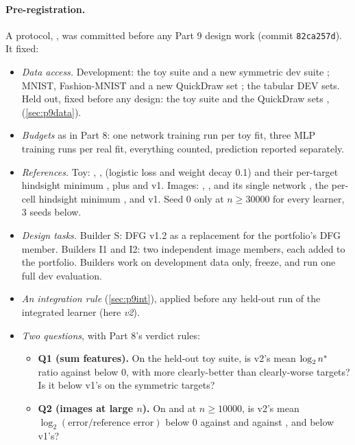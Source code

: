 \paragraph{Pre-registration.} A protocol, , was committed before any Part 9 design work (commit \texttt{82ca257d}). It fixed:
\begin{itemize}
\item \emph{Data access.} Development: the toy  suite and a new symmetric dev suite ; MNIST, Fashion-MNIST and a new QuickDraw set ; the tabular DEV sets. Held out, fixed before any design: the toy suite  and the QuickDraw sets ,  (\cref{sec:p9data}).
\item \emph{Budgets} as in Part 8: one network training run per toy fit, three MLP training runs per real fit, everything counted, prediction reported separately.
\item \emph{References.} Toy: , ,  (logistic loss and weight decay 0.1) and their per-target hindsight minimum , plus  and v1. Images: , ,  and its single network , the per-cell hindsight minimum ,  and v1. Seed 0 only at $n\ge30000$ for every learner, 3 seeds below.
\item \emph{Design tasks.} Builder S: DFG v1.2 as a replacement for the portfolio's DFG member. Builders I1 and I2: two independent image members, each added to the portfolio. Builders work on development data only, freeze, and run one full dev evaluation.
\item \emph{An integration rule} (\cref{sec:p9int}), applied before any held-out run of the integrated learner  (here \emph{v2}).
\item \emph{Two questions}, with Part 8's verdict rules:
  \begin{itemize}
  \item \textbf{Q1 (sum features).} On the held-out toy suite, is v2's mean $\log_2n^{*}$ ratio against  below 0, with more clearly-better than clearly-worse targets? Is it below v1's on the symmetric targets?
  \item \textbf{Q2 (images at large $n$).} On  and  at $n\ge10000$, is v2's mean $\log_2(\text{error}/\text{reference error})$ below 0 against  and against , and below v1's?
  \end{itemize}
\end{itemize}

